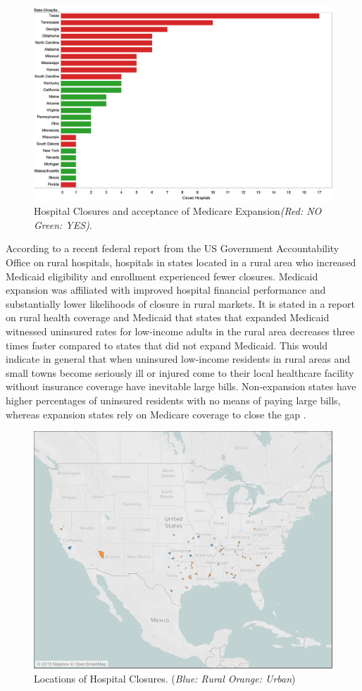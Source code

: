 \documentclass[10pt,conference]{IEEEtran}
\begin{document}
\begin{figure}[htbp]
\centerline{\includegraphics[width=\textwidth]{HC_and_ME.png}}
\caption{Hospital Closures and acceptance of Medicare Expansion\newline \textit{(Red: NO Green: YES)}.}
\label{HC_ME}
\end{figure}
According to a recent federal report from the US Government Accountability Office on rural hospitals, hospitals in states located in a rural area who increased Medicaid eligibility and enrollment experienced fewer closures. Medicaid expansion was affiliated with improved hospital financial performance and substantially lower likelihoods of closure in rural markets. It is stated in a report on rural health coverage and Medicaid that states that expanded Medicaid witnessed uninsured rates for low-income adults in the rural area decreases three times faster compared to states that did not expand Medicaid. This would indicate in general that when uninsured low-income residents in rural areas and small towns become seriously ill or injured come to their local healthcare facility without insurance coverage have inevitable large bills. Non-expansion states have higher percentages of uninsured residents with no means of paying large bills, whereas expansion states rely on Medicare coverage to close the gap \cite{searing}.

\begin{figure}[htbp]
\centerline{\includegraphics[width=.75\textwidth]{HC_RU.png}}
\caption{Locations of Hospital Closures. (\textit{Blue: Rural Orange: Urban})}
\label{Location_HC}
\end{figure}
\end{document}
